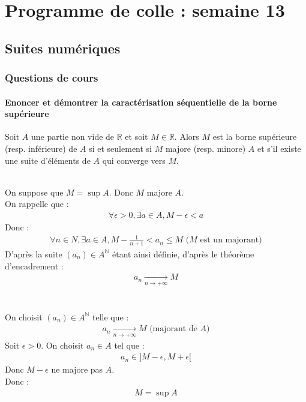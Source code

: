 \documentclass[titlepage, twoside]{report}
\makeatletter
\renewcommand{\tableofcontents}{%
  \@starttoc{toc}
}
\makeatother
\begin{document}
\chapter*{Programme de colle : semaine 13}
\tableofcontents

\section{Suites numériques}
\subsection{Questions de cours}
\subsubsection{Enoncer et démontrer la caractérisation séquentielle de la borne supérieure}
\begin{tcolorbox}[title=Théorème 14.41, title filled=false, colframe=orange, colback=orange!10!white]
    Soit $A$ une partie non vide de $\mathbb{R}$ et soit $M \in \mathbb{R}$. Alors $M$ est la borne supérieure (resp. inférieure) de $A$ si et seulement si $M$ majore (resp. minore) $A$ et s'il existe une suite d'éléments de $A$ qui converge vers $M$. 
\end{tcolorbox}

\boxed{\Rightarrow} \\
On suppose que $M = \sup A$. Donc $M$ majore $A$. \\
On rappelle que : 
\begin{align*}
    \forall \epsilon > 0, \exists a \in A, M - \epsilon < a
\end{align*}
Donc : 
\begin{align*}
    \forall n \in N, \exists a \in A, M - \frac{1}{n+1} < a_n \leq M \text{ ($M$ est un majorant)}
\end{align*}
D'après la suite $(a_n) \in A^{\mathbb{N}}$ étant ainsi définie, d'après le théorème d'encadrement : 
\begin{align*}
    \boxed{a_n \underset{n \to +\infty}{\longrightarrow} M}
\end{align*} \\

\boxed{\Leftarrow} \\
On choisit $(a_n) \in A^{\mathbb{N}}$ telle que : 
\begin{align*}
    a_n \underset{n \to +\infty}{\longrightarrow} M \text{ (majorant de $A$)}
\end{align*}
Soit $\epsilon > 0$. On choisit $a_n \in A$ tel que : 
\begin{align*}
    a_n \in ]M-\epsilon, M+\epsilon[
\end{align*}
Donc $M - \epsilon$ ne majore pas $A$. \\
Donc : 
\begin{align*}
    \boxed{M = \sup A}
\end{align*}
\end{document}
